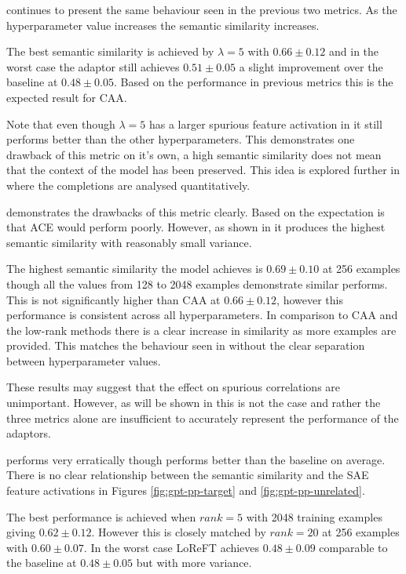  continues to present the same behaviour seen in the previous two metrics.
As the hyperparameter value increases the semantic similarity increases.

The best semantic similarity is achieved by $\lambda = 5$ with $0.66 \pm 0.12$ and in the worst case the adaptor still achieves $0.51 \pm 0.05$ a slight improvement over the baseline at $0.48 \pm 0.05$.
Based on the performance in previous metrics this is the expected result for CAA.

Note that even though $\lambda = 5$ has a larger spurious feature activation in  it still performs better than the other hyperparameters.
This demonstrates one drawback of this metric on it's own, a high semantic similarity does not mean that the context of the model has been preserved.
This idea is explored further in  where the completions are analysed quantitatively.

 demonstrates the drawbacks of this metric clearly.
Based on  the expectation is that ACE would perform poorly.
However, as shown in  it produces the highest semantic similarity with reasonably small variance.

The highest semantic similarity the model achieves is $0.69 \pm 0.10$ at 256 examples though all the values from 128 to 2048 examples demonstrate similar performs.
This is not significantly higher than CAA at $0.66 \pm 0.12$, however this performance is consistent across all hyperparameters.
In comparison to CAA and the low-rank methods there is a clear increase in similarity as more examples are provided.
This matches the behaviour seen in  without the clear separation between hyperparameter values.

These results may suggest that the effect on spurious correlations are unimportant.
However, as will be shown in  this is not the case and rather the three metrics alone are insufficient to accurately represent the performance of the adaptors.

 performs very erratically though performs better than the baseline on average.
There is no clear relationship between the semantic similarity and the SAE feature activations in Figures \ref{fig:gpt-pp-target} and \ref{fig:gpt-pp-unrelated}.

The best performance is achieved when $rank = 5$ with 2048 training examples giving $0.62 \pm 0.12$.
However this is closely matched by $rank = 20$ at 256 examples with $0.60 \pm 0.07$.
In the worst case LoReFT achieves $0.48 \pm 0.09$ comparable to the baseline at $0.48 \pm 0.05$ but with more variance.

